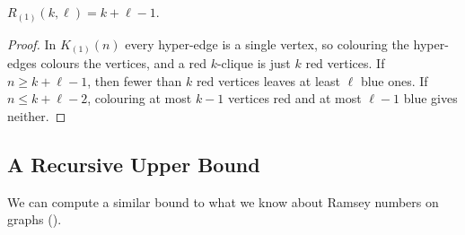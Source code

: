 \begin{boxlemma} \label{Ch2:Lemma:Hypergraph_Ramsey_1}
    $R_{(1)}(k, \ell) = k + \ell - 1$.
\end{boxlemma}
\begin{proof}
    In $K_{(1)}(n)$ every hyper-edge is a single vertex, so colouring the hyper-edges colours the vertices, and a red $k$-clique is just $k$ red vertices. If $n \geq k + \ell - 1$, then fewer than $k$ red vertices leaves at least $\ell$ blue ones. If $n \leq k + \ell - 2$, colouring at most $k - 1$ vertices red and at most $\ell - 1$ blue gives neither.
\end{proof}

\subsection{A Recursive Upper Bound}

We can compute a similar bound to what we know about Ramsey numbers on graphs ().

